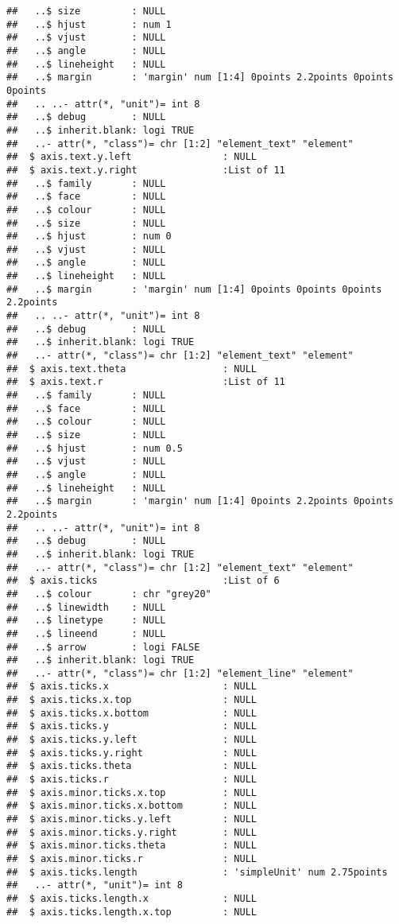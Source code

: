 \documentclass[
]{article}
\begin{document}
\begin{verbatim}
##   ..$ size         : NULL
##   ..$ hjust        : num 1
##   ..$ vjust        : NULL
##   ..$ angle        : NULL
##   ..$ lineheight   : NULL
##   ..$ margin       : 'margin' num [1:4] 0points 2.2points 0points 0points
##   .. ..- attr(*, "unit")= int 8
##   ..$ debug        : NULL
##   ..$ inherit.blank: logi TRUE
##   ..- attr(*, "class")= chr [1:2] "element_text" "element"
##  $ axis.text.y.left                : NULL
##  $ axis.text.y.right               :List of 11
##   ..$ family       : NULL
##   ..$ face         : NULL
##   ..$ colour       : NULL
##   ..$ size         : NULL
##   ..$ hjust        : num 0
##   ..$ vjust        : NULL
##   ..$ angle        : NULL
##   ..$ lineheight   : NULL
##   ..$ margin       : 'margin' num [1:4] 0points 0points 0points 2.2points
##   .. ..- attr(*, "unit")= int 8
##   ..$ debug        : NULL
##   ..$ inherit.blank: logi TRUE
##   ..- attr(*, "class")= chr [1:2] "element_text" "element"
##  $ axis.text.theta                 : NULL
##  $ axis.text.r                     :List of 11
##   ..$ family       : NULL
##   ..$ face         : NULL
##   ..$ colour       : NULL
##   ..$ size         : NULL
##   ..$ hjust        : num 0.5
##   ..$ vjust        : NULL
##   ..$ angle        : NULL
##   ..$ lineheight   : NULL
##   ..$ margin       : 'margin' num [1:4] 0points 2.2points 0points 2.2points
##   .. ..- attr(*, "unit")= int 8
##   ..$ debug        : NULL
##   ..$ inherit.blank: logi TRUE
##   ..- attr(*, "class")= chr [1:2] "element_text" "element"
##  $ axis.ticks                      :List of 6
##   ..$ colour       : chr "grey20"
##   ..$ linewidth    : NULL
##   ..$ linetype     : NULL
##   ..$ lineend      : NULL
##   ..$ arrow        : logi FALSE
##   ..$ inherit.blank: logi TRUE
##   ..- attr(*, "class")= chr [1:2] "element_line" "element"
##  $ axis.ticks.x                    : NULL
##  $ axis.ticks.x.top                : NULL
##  $ axis.ticks.x.bottom             : NULL
##  $ axis.ticks.y                    : NULL
##  $ axis.ticks.y.left               : NULL
##  $ axis.ticks.y.right              : NULL
##  $ axis.ticks.theta                : NULL
##  $ axis.ticks.r                    : NULL
##  $ axis.minor.ticks.x.top          : NULL
##  $ axis.minor.ticks.x.bottom       : NULL
##  $ axis.minor.ticks.y.left         : NULL
##  $ axis.minor.ticks.y.right        : NULL
##  $ axis.minor.ticks.theta          : NULL
##  $ axis.minor.ticks.r              : NULL
##  $ axis.ticks.length               : 'simpleUnit' num 2.75points
##   ..- attr(*, "unit")= int 8
##  $ axis.ticks.length.x             : NULL
##  $ axis.ticks.length.x.top         : NULL

\end{verbatim}
\end{document}

